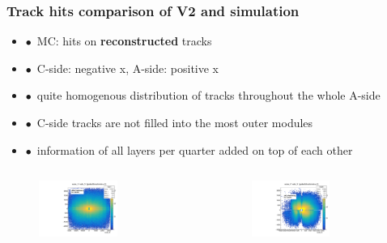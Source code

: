 \documentclass[aspectratio=1610, 12pt]{beamer}
\begin{document}
\begin{frame}\frametitle{Track hits comparison of V2 and simulation}
  \begin{itemize}
    \item $\bullet$\, MC: hits on \textbf{reconstructed} tracks
    \item $\bullet$\, C-side: negative x, A-side: positive x
    \item $\bullet$\, quite homogenous distribution of tracks throughout the whole A-side
    \item $\bullet$\, C-side tracks are not filled into the most outer modules
    \item $\bullet$\, information of all layers per quarter added on top of each other
  \end{itemize}
  \begin{columns}
    \begin{column}[c]{0.48\textwidth}
      \begin{figure}
        \centering
        \includegraphics[width=0.6\textwidth]{logos/nodeXY_MC.pdf}%
      \end{figure}
    \end{column}
    \begin{column}[c]{0.48\textwidth}
      \begin{figure}
        \centering
        \includegraphics[width=0.6\textwidth]{tuples_out/combining_2D_nodeXY_v2.pdf}%
      \end{figure}
    \end{column}
  \end{columns}
\end{frame}
\end{document}
